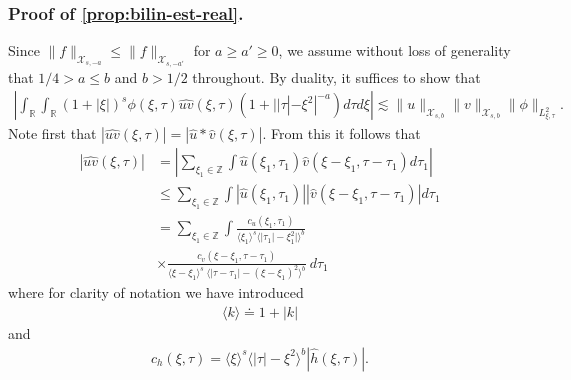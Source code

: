 \documentclass[12pt,reqno]{amsart}
\numberwithin{equation}{section}  %
\numberwithin{figure}{section}
\newcommand{\rr}{\mathbb{R}}
\newcommand{\zz}{\mathbb{Z}}
\newcommand{\wh}{\widehat}
\theoremstyle{plain}
\theoremstyle{definition}
\theoremstyle{remark}
\begin{document}
\subsubsection{Proof of \autoref{prop:bilin-est-real}.} 
\label{sssec:bilin-est-real}
Since $\| f \|_{\mathcal{X}_{s,-a}} \le \| f \|_{\mathcal{X}_{s, -a'}}$ for $a \ge a' \ge 0$, we assume
without loss of generality that $1/4 > a \le b$ and $b > 1/2$ throughout. 
By duality, it suffices to show that 
%
\begin{equation}
	\label{duality-est-real}
	\begin{split}
    |	\int_{\rr} \int_{\rr} (1 + |\xi|)^{s}
		\phi(\xi, \tau) \wh{uv}(\xi, \tau)(1 
    + | |\tau| - \xi^{2} |^{-a}) d \tau d \xi | \lesssim \|u\|_{\mathcal{X}_{s,b}}
    \|v\|_{\mathcal{X}_{s,b}}
    \|\phi \|_{L^{2}_{\xi, \tau}}.
	\end{split}
\end{equation}
Note first that $|\wh{uv}(\xi, \tau) |  = | \wh{u} *  \wh{v} 
(\xi, \tau)|$. From this it follows that
%
%
\begin{equation}
	\label{non-lin-rep-real}
	\begin{split}
		| \wh{uv}(\xi, \tau)|
    & = | \sum_{\xi_{1} \in \zz }  \int
    \wh{u}\left( \xi_1,  \tau_1 \right) \wh{v}\left( \xi - \xi_1 , \tau - \tau_1   
\right) d \tau_1 |
\\
& \le  \sum_{\xi_{1} \in \zz }  \int
    |\wh{u}\left( \xi_1,  \tau_1 \right)| |\wh{v}\left( \xi - \xi_1 , \tau - \tau_1   
\right)| d \tau_1 
\\
& = \sum_{\xi_1 \in \zz } \int \frac{c_u\left( \xi_1, \tau_1 
\right)}{\langle \xi_1 \rangle ^s \langle |\tau_1| - \xi_1^{2} | \rangle ^{b}}
\\
& \times \frac{c_{v}\left( \xi - \xi_1, \tau - \tau_1 \right)}{\langle \xi -
\xi_1 \rangle ^s\ \langle |\tau - \tau_1 | -  (\xi - \xi_1)^{2} \rangle^{b}}
  \ d \tau_1 
\end{split}
\end{equation}
%
%
where for clarity of notation we have introduced 
%
%
%
\begin{equation*}
\begin{split}
\langle k \rangle \doteq 1 + |k|
\end{split}
\end{equation*}
%
%
and
%
\begin{equation*}
	\begin{split}
		c_h(\xi, \tau) =
			\langle \xi \rangle ^s \langle |\tau| - \xi^{2} \rangle ^{b} | \wh{h}\left( \xi, \tau \right) |.
	\end{split}
\end{equation*}
\end{document}
